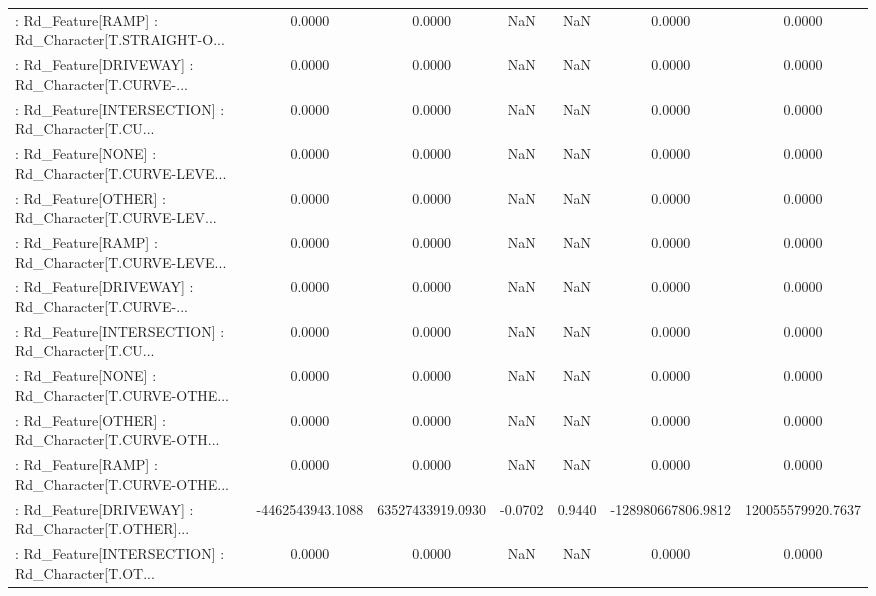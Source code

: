 \begin{longtable}{p{4cm}cccccc}
 : Rd\_Feature[RAMP] : Rd\_Character[T.STRAIGHT-O... &            0.0000 &            0.0000 &     NaN &          NaN &             0.0000 &            0.0000 \\
 : Rd\_Feature[DRIVEWAY] : Rd\_Character[T.CURVE-... &            0.0000 &            0.0000 &     NaN &          NaN &             0.0000 &            0.0000 \\
 : Rd\_Feature[INTERSECTION] : Rd\_Character[T.CU... &            0.0000 &            0.0000 &     NaN &          NaN &             0.0000 &            0.0000 \\
 : Rd\_Feature[NONE] : Rd\_Character[T.CURVE-LEVE... &            0.0000 &            0.0000 &     NaN &          NaN &             0.0000 &            0.0000 \\
 : Rd\_Feature[OTHER] : Rd\_Character[T.CURVE-LEV... &            0.0000 &            0.0000 &     NaN &          NaN &             0.0000 &            0.0000 \\
 : Rd\_Feature[RAMP] : Rd\_Character[T.CURVE-LEVE... &            0.0000 &            0.0000 &     NaN &          NaN &             0.0000 &            0.0000 \\
 : Rd\_Feature[DRIVEWAY] : Rd\_Character[T.CURVE-... &            0.0000 &            0.0000 &     NaN &          NaN &             0.0000 &            0.0000 \\
 : Rd\_Feature[INTERSECTION] : Rd\_Character[T.CU... &            0.0000 &            0.0000 &     NaN &          NaN &             0.0000 &            0.0000 \\
 : Rd\_Feature[NONE] : Rd\_Character[T.CURVE-OTHE... &            0.0000 &            0.0000 &     NaN &          NaN &             0.0000 &            0.0000 \\
 : Rd\_Feature[OTHER] : Rd\_Character[T.CURVE-OTH... &            0.0000 &            0.0000 &     NaN &          NaN &             0.0000 &            0.0000 \\
 : Rd\_Feature[RAMP] : Rd\_Character[T.CURVE-OTHE... &            0.0000 &            0.0000 &     NaN &          NaN &             0.0000 &            0.0000 \\
 : Rd\_Feature[DRIVEWAY] : Rd\_Character[T.OTHER]... &  -4462543943.1088 &  63527433919.0930 & -0.0702 &       0.9440 & -128980667806.9812 & 120055579920.7637 \\
 : Rd\_Feature[INTERSECTION] : Rd\_Character[T.OT... &            0.0000 &            0.0000 &     NaN &          NaN &             0.0000 &            0.0000 \\

\end{longtable}
